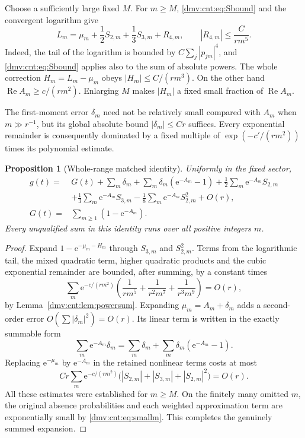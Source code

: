 \documentclass[11pt,letterpaper]{article}
\numberwithin{equation}{section}
\newtheorem{proposition}[theorem]{Proposition}
\theoremstyle{definition}\newtheorem{definition}[theorem]{Definition}
\theoremstyle{remark}\newtheorem{remark}[theorem]{Remark}
\newcommand{\ee}{\mathrm e}
\DeclareMathOperator{\Rea}{Re}
\begin{document}
Choose a sufficiently large fixed $M$. For $m\ge M$, \eqref{dmv:cnt:eq:Sbound} and the convergent logarithm give
\begin{equation}\label{dmv:cnt:eq:logexpand}
L_m=\mu_m+\frac12S_{2,m}+\frac13S_{3,m}+R_{4,m},\qquad
|R_{4,m}|\le\frac{C}{rm^5}.
\end{equation}
Indeed, the tail of the logarithm is bounded by $C\sum_j|p_{jm}|^4$, and \eqref{dmv:cnt:eq:Sbound} applies also to the sum of absolute powers. The whole correction $H_m=L_m-\mu_m$ obeys $|H_m|\le C/(rm^3)$. On the other hand $\Rea A_m\ge c/(rm^2)$. Enlarging $M$ makes $|H_m|$ a fixed small fraction of $\Rea A_m$.

The first-moment error $\delta_m$ need not be relatively small compared with $A_m$ when $m\gg r^{-1}$, but its global absolute bound $|\delta_m|\le Cr$ suffices. Every exponential remainder is consequently dominated by a fixed multiple of $\exp(-c'/(rm^2))$ times its polynomial estimate.

\begin{proposition}[Whole-range matched identity]\label{dmv:cnt:prop:matched}
Uniformly in the fixed sector,
\begin{align}\label{dmv:cnt:eq:matched}
g(t)={}&G(t)+\sum_m\delta_m+\sum_m\delta_m(\ee^{-A_m}-1)
 +\frac12\sum_m\ee^{-A_m}S_{2,m}\nonumber\\
 &+\frac13\sum_m\ee^{-A_m}S_{3,m}
 -\frac18\sum_m\ee^{-A_m}S_{2,m}^2+O(r),\\
G(t)={}&\sum_{m\ge1}(1-\ee^{-A_m}).\nonumber
\end{align}
Every unqualified sum in this identity runs over all positive integers $m$.
\end{proposition}
\begin{proof}
Expand $1-\ee^{-\mu_m-H_m}$ through $S_{3,m}$ and $S_{2,m}^2$. Terms from the logarithmic tail, the mixed quadratic term, higher quadratic products and the cubic exponential remainder are bounded, after summing, by a constant times
\begin{equation}\label{dmv:cnt:eq:sumremainder}
\sum_m\ee^{-c/(rm^2)}
\left(\frac1{rm^5}+\frac1{r^2m^7}+\frac1{r^3m^9}\right)=O(r),
\end{equation}
by Lemma~\ref{dmv:cnt:lem:powersum}. Expanding $\mu_m=A_m+\delta_m$ adds a second-order error $O(\sum|\delta_m|^2)=O(r)$. Its linear term is written in the exactly summable form
\[
\sum_m\ee^{-A_m}\delta_m
=\sum_m\delta_m+\sum_m\delta_m(\ee^{-A_m}-1).
\]
Replacing $\ee^{-\mu_m}$ by $\ee^{-A_m}$ in the retained nonlinear terms costs at most
\[
Cr\sum_m\ee^{-c/(rm^2)}\bigl(|S_{2,m}|+|S_{3,m}|+|S_{2,m}|^2\bigr)=O(r).
\]
All these estimates were established for $m\ge M$. On the finitely many omitted $m$, the original absence probabilities and each weighted approximation term are exponentially small by \eqref{dmv:cnt:eq:smallm}. This completes the genuinely summed expansion.
\end{proof}
\end{document}
